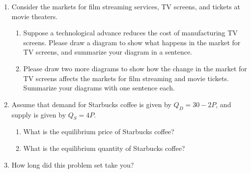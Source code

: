 \documentclass{article}
\begin{document}
\begin{enumerate}
\item Consider the markets for film streaming services, TV screens, and tickets at movie theaters.

	\begin{enumerate}
	
	\item Suppose a technological advance reduces the cost of manufacturing TV screens. Please draw a diagram to show what happens in the market for TV screens, and summarize your diagram in a sentence.
	
	\item Please draw two more diagrams to show how the change in the market for TV screens affects the markets for film streaming and movie tickets. Summarize your diagrams with one sentence each. 
	
	\end{enumerate}
	
\item Assume that demand for Starbucks coffee is given by $Q_D = 30 - 2P$, and supply is given by $Q_S = 4P$.

	\begin{enumerate}
	
	\item What is the equilibrium price of Starbucks coffee?
	
	\item What is the equilibrium quantity of Starbucks coffee?
	
	\end{enumerate}
	
\item How long did this problem set take you?

\end{enumerate}
\end{document}
